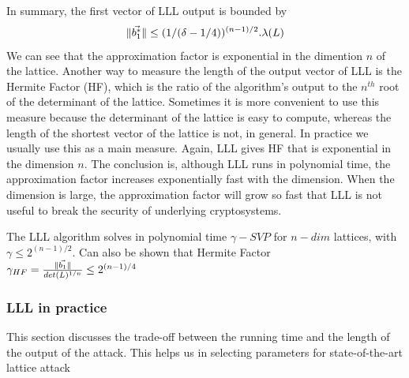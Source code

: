 
In summary, the first vector of LLL output is bounded by
\[
  \Vert \vec{b_1^*} \Vert \leq (1/(\delta-1/4))^{(n-1)/2}.\lambda(L)
\]
We can see that the approximation factor is exponential in the dimention $n$ of
the lattice. Another way to measure the length of the output vector of LLL is the Hermite
Factor (HF), which is the ratio of the algorithm's output to the $n^{th}$ root
of the determinant of the lattice. Sometimes it is more convenient to use this
measure because the determinant of the lattice is easy to compute,
whereas the length of the shortest vector of the lattice is not, in general. In
practice we usually use this as a main measure. Again, LLL gives HF that is
exponential in the dimension $n$. The conclusion is, although LLL runs in
polynomial time, the approximation factor increases exponentially fast with
the dimension. When the dimension is large, the approximation factor will grow
so fast that LLL is not useful to break the security of underlying
cryptosystems.
\begin{theorem}
  The LLL algorithm solves in polynomial time $\gamma-SVP$ for $n-dim$ lattices,
  with $\gamma \leq 2^{(n-1)/2}$. Can also be shown that Hermite Factor
  $\gamma_{HF} = \frac{\Vert \vec{b_1} \Vert}{det(L)^{1/n}} \leq 2^{(n-1)/4}$
  \label{theo:LLLHF}
\end{theorem}

\subsubsection{LLL in practice}
\label{sec:LLLinPractice}
This section discusses the trade-off between the running time and the length of
the output of the attack. This helps us in selecting parameters for
state-of-the-art lattice attack

